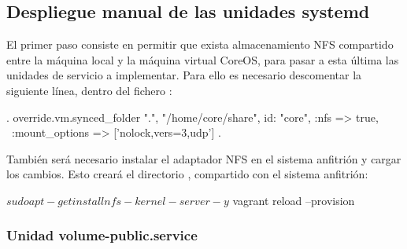 \begin{codelisting}
\end{codelisting}

\subsection{Despliegue manual de las unidades systemd}

El primer paso consiste en permitir que exista almacenamiento NFS compartido entre la máquina local y la máquina virtual CoreOS, para pasar a esta última las unidades de servicio a implementar. Para ello es necesario descomentar la siguiente línea, dentro del fichero :

\begin{codelisting}
\label{code:vagrantfile2}
\begin{code}
.
override.vm.synced_folder ".", "/home/core/share", id: "core", :nfs => true, \
:mount_options => ['nolock,vers=3,udp']
.
\end{code}
\end{codelisting}

También será necesario instalar el adaptador NFS en el sistema anfitrión y cargar los cambios. Esto creará el directorio , compartido con el sistema anfitrión:

\begin{code}
$ sudo apt-get install nfs-kernel-server -y
$ vagrant reload --provision
\end{code}

\subsubsection{Unidad volume-public.service}

